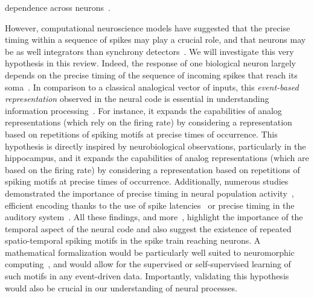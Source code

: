 \documentclass[brainsci, %
               review,submit,pdftex,moreauthors
               ]{Definitions/mdpi}
\begin{document}
dependence across neurons~\citep{perkel_neuronal_1967-1}. 

However, computational neuroscience models have suggested that the precise timing within a sequence of spikes may play a crucial role, and that neurons may be as well integrators than synchrony detectors~\citep{abeles_role_1982}. We will investigate this very hypothesis in this review. Indeed, the response of one biological neuron largely depends on the precise timing of the sequence of incoming spikes that reach its soma~\citep{paugam-moisy_computing_2012}. In comparison to a classical analogical vector of inputs, this \emph{event-based representation} observed in the neural code is essential in understanding information processing~\citep{carr_processing_1993}. For instance, it expands the capabilities of analog representations (which rely on the firing rate) by considering a representation based on repetitions of spiking motifs at precise times of occurrence. This hypothesis is directly inspired by neurobiological observations, particularly in the hippocampus, and it expands the capabilities of analog representations (which are based on the firing rate) by considering a representation based on repetitions of spiking motifs at precise times of occurrence. Additionally, numerous studies demonstrated the importance of precise timing in neural population activity~\citep{davis_spontaneous_2021}, efficient encoding thanks to the use of spike latencies~\citep{perrinet_coding_2004,gollisch_rapid_2008} or precise timing in the auditory system~\citep{deweese_binary_2003,carr_circuit_1990}. All these findings, and more~\citep{bohte_evidence_2004}, highlight the importance of the temporal aspect of the neural code and also suggest the existence of repeated spatio-temporal spiking motifs in the spike train reaching neurons.  A mathematical formalization would be particularly well suited to neuromorphic computing~\citep{roy_towards_2019}, and would allow for the supervised or self-supervised learning of such motifs in any event-driven data.  Importantly, validating this hypothesis would also be crucial in our understanding of neural processes.
%
\end{document}

